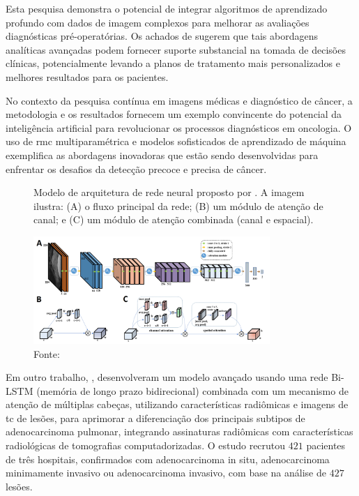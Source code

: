Esta pesquisa demonstra o potencial de integrar algoritmos de aprendizado profundo com dados de imagem complexos para melhorar as avaliações diagnósticas pré-operatórias. Os achados de  sugerem que tais abordagens analíticas avançadas podem fornecer suporte substancial na tomada de decisões clínicas, potencialmente levando a planos de tratamento mais personalizados e melhores resultados para os pacientes.

No contexto da pesquisa contínua em imagens médicas e diagnóstico de câncer, a metodologia e os resultados fornecem um exemplo convincente do potencial da inteligência artificial para revolucionar os processos diagnósticos em oncologia. O uso de \gls{rmc} multiparamétrica e modelos sofisticados de aprendizado de máquina exemplifica as abordagens inovadoras que estão sendo desenvolvidas para enfrentar os desafios da detecção precoce e precisa de câncer.

\begin{figure}[htbp]
    \centering
    \captionsetup{width=0.98\textwidth, justification=justified}
    \caption{Modelo de arquitetura de rede neural proposto por . A imagem ilustra: (A) o fluxo principal da rede; (B) um módulo de atenção de canal; e (C) um módulo de atenção combinada (canal e espacial).}
    \includegraphics[width=0.8\textwidth]{figures/fig007.png}
    \caption*{Fonte: \cite{jiangMRIBasedRadiomics2021}}
    \label{fig:fig007}
\end{figure}

Em outro trabalho, , desenvolveram um modelo avançado usando uma rede Bi-LSTM (memória de longo prazo bidirecional) combinada com um mecanismo de atenção de múltiplas cabeças, utilizando características radiômicas e imagens de \gls{tc} de lesões, para aprimorar a diferenciação dos principais subtipos de adenocarcinoma pulmonar, integrando assinaturas radiômicas com características radiológicas de tomografias computadorizadas. O estudo recrutou $421$ pacientes de três hospitais, confirmados com adenocarcinoma in situ, adenocarcinoma minimamente invasivo ou adenocarcinoma invasivo, com base na análise de $427$ lesões.

